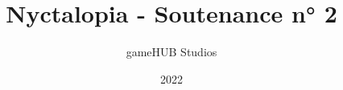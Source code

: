 \documentclass[aspectratio=169]{beamer}
\title[Soutenance 2]{Nyctalopia - Soutenance n° 2}
\author[gameHUB Studios]{gameHUB Studios}
\date{2022}
\begin{document}
\begin{frame}[plain]
    \titlepage
\end{frame}









\end{document}
